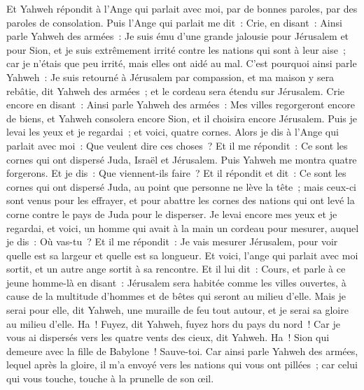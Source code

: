 \begin{multicols}{2}
Et Yahweh répondit à l'Ange qui parlait avec moi, par de bonnes paroles, par des paroles de consolation.
Puis l'Ange qui parlait me dit~: Crie, en disant~: Ainsi parle Yahweh des armées~: Je suis ému d'une grande jalousie pour Jérusalem et pour Sion,
et je suis extrêmement irrité contre les nations qui sont à leur aise~; car je n'étais que peu irrité, mais elles ont aidé au mal.
C'est pourquoi ainsi parle Yahweh~: Je suis retourné à Jérusalem par compassion, et ma maison y sera rebâtie, dit Yahweh des armées~; et le cordeau sera étendu sur Jérusalem.
Crie encore en disant~: Ainsi parle Yahweh des armées~: Mes villes regorgeront encore de biens, et Yahweh consolera encore Sion, et il choisira encore Jérusalem.
Puis je levai les yeux et je regardai~; et voici, quatre cornes.
Alors je dis à l'Ange qui parlait avec moi~: Que veulent dire ces choses~? Et il me répondit~: Ce sont les cornes qui ont dispersé Juda, Israël et Jérusalem.
Puis Yahweh me montra quatre forgerons.
Et je dis~: Que viennent-ils faire~? Et il répondit et dit~: Ce sont les cornes qui ont dispersé Juda, au point que personne ne lève la tête~; mais ceux-ci sont venus pour les effrayer, et pour abattre les cornes des nations qui ont levé la corne contre le pays de Juda pour le disperser.
\VerseOne{}Je levai encore mes yeux et je regardai, et voici, un homme qui avait à la main un cordeau pour mesurer,
auquel je dis~: Où vas-tu~? Et il me répondit~: Je vais mesurer Jérusalem, pour voir quelle est sa largeur et quelle est sa longueur.
Et voici, l'ange qui parlait avec moi sortit, et un autre ange sortit à sa rencontre.
Et il lui dit~: Cours, et parle à ce jeune homme-là en disant~: Jérusalem sera habitée comme les villes ouvertes, à cause de la multitude d'hommes et de bêtes qui seront au milieu d'elle.
Mais je serai pour elle, dit Yahweh, une muraille de feu tout autour, et je serai sa gloire au milieu d'elle.
Ha~! Fuyez, dit Yahweh, fuyez hors du pays du nord~! Car je vous ai dispersés vers les quatre vents des cieux, dit Yahweh.
Ha~! Sion qui demeure avec la fille de Babylone~! Sauve-toi.
Car ainsi parle Yahweh des armées, lequel après la gloire, il m'a envoyé vers les nations qui vous ont pillées~; car celui qui vous touche, touche à la prunelle de son œil.

\end{multicols}
